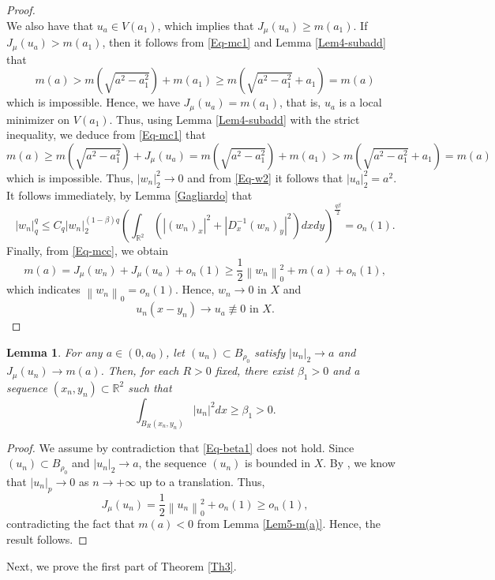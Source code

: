 \documentclass[11pt]{amsart}
\newtheorem{lemma}[theorem]{Lemma}
\numberwithin{equation}{section}
\begin{document}
{{\begin{proof}
\begin{equation}
    \end{equation}
    We also have that $u_a \in V\left(a_1\right)$, which implies that $J_\mu\left(u_a\right) \geq m\left(a_1\right)$. If $J_\mu\left(u_a\right)>m\left(a_1\right)$, then it follows from \eqref{Eq-mc1} and Lemma \ref{Lem4-subadd} that
    $$
    m(a)>m\left(\sqrt{a^2-a_1^2}\right)+m\left(a_1\right) \geq m\left(\sqrt{a^2-a_1^2}+a_1\right)=m(a)
    $$
    which is impossible. Hence, we have $J_\mu\left(u_a\right)=m\left(a_1\right)$, that is, $u_a$ is a local minimizer on $V\left(a_1\right)$. Thus, using Lemma \ref{Lem4-subadd} with the strict inequality, we deduce from \eqref{Eq-mc1} that
    $$
    m(a) \geq m\left(\sqrt{a^2-a_1^2}\right)+J_\mu\left(u_a\right)=m\left(\sqrt{a^2-a_1^2}\right)+m\left(a_1\right)>m\left(\sqrt{a^2-a_1^2}+a_1\right)=m(a)
    $$
    which is impossible. Thus,  $ \left|w_n\right|_2^2 \rightarrow 0 $ and from \eqref{Eq-w2} it follows that $\left|u_a\right|_2^2=a^2$.
    It follows immediately, by Lemma \ref{Gagliardo} that
    $$
    |w_n|^{q}_{q} \leq C_q|w_n|^{(1-\beta )q}_{2}\left(\int_{\mathbb{R}^2}\left(\left|(w_n)_x\right|^2+\left|D_x^{-1} (w_n)_y\right|^2\right) d xdy\right)^{\frac{q\beta}{2}}=o_n(1).
    $$
    Finally, from \eqref{Eq-mcc}, we obtain
    $$
    m(a)=J_\mu\left(w_n\right)+J_\mu\left(u_a\right)+o_n(1) \geq \frac{1}{2}\left\|w_n\right\|_0^2+m(a)+o_n(1),
    $$
    which indicates $\left\| w_n\right\|_0 =o_n(1)$. Hence,  $w_n \rightarrow 0$ in $X$ and
    $$u_n\left(x-y_n\right) \rightarrow u_a \not \equiv 0 \text{ in } X.$$
\end{proof}



\begin{lemma}\label{Lem5-vanish}
    For any $a\in\left(0, a_0\right)$, let $(u_n) \subset B_{\rho_0}$ satisfy $\left|u_n\right|_2 \rightarrow a$ and $J_\mu\left(u_n\right) \rightarrow m(a)$. Then, for each $R>0$ fixed, there exist  $\beta_1>0$ and a sequence $(x_n,y_n) \subset \mathbb{R}^2$ such that
    \begin{equation}\label{Eq-beta1}
        \int_{B_R\left(x_n, y_n\right)}\left|u_n\right|^2 d x \geq \beta_1>0.
    \end{equation}
\end{lemma}
\begin{proof}
    We assume by contradiction that \eqref{Eq-beta1} does not hold. Since $(u_n)  \subset B_{\rho_0}$ and $\left|u_n\right|_2 \rightarrow a$, the sequence $(u_n) $ is bounded in $X$. By {
    \cite[Lemma I.1]{LionsCCPLocal2}}, {we know that} $\left|u_n\right|_p \rightarrow 0$ as $n \rightarrow +\infty$ up to a translation. Thus,
    {$$
    J_\mu\left(u_n\right) =\frac{1}{2}\left\| u_n\right\|_0^2+o_n(1)\geq o_n(1),
    $$}
{contradicting the fact that $m(a)<0$ from Lemma \ref{Lem5-m(a)}. Hence, the result follows.}
\end{proof}
Next, we prove the first part of Theorem \ref{Th3}.

}}
\end{document}
